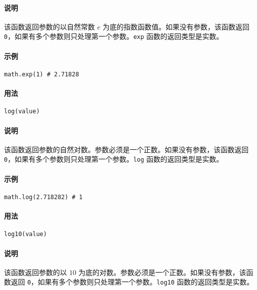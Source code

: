 \paragraph{说明}
该函数返回参数的以自然常数 $e$ 为底的指数函数值。如果没有参数，该函数返回 \texttt{0}，如果有多个参数则只处理第一个参数。\texttt{exp} 函数的返回类型是实数。

\paragraph{示例}
\begin{lstlisting}[language=berry, numbers=none]
math.exp(1) # 2.71828
\end{lstlisting}


\paragraph{用法}
\begin{lstlisting}[language=berry, numbers=none]
log(value)
\end{lstlisting}

\paragraph{说明}
该函数返回参数的自然对数。参数必须是一个正数。如果没有参数，该函数返回 \texttt{0}，如果有多个参数则只处理第一个参数。\texttt{log} 函数的返回类型是实数。

\paragraph{示例}
\begin{lstlisting}[language=berry, numbers=none]
math.log(2.718282) # 1
\end{lstlisting}


\paragraph{用法}
\begin{lstlisting}[language=berry, numbers=none]
log10(value)
\end{lstlisting}

\paragraph{说明}
该函数返回参数的以 $10$ 为底的对数。参数必须是一个正数。如果没有参数，该函数返回 \texttt{0}，如果有多个参数则只处理第一个参数。\texttt{log10} 函数的返回类型是实数。

